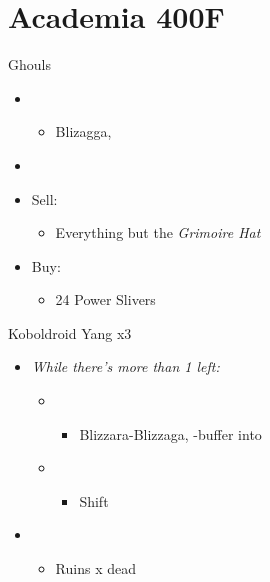 \chapter{Academia 400F}

\begin{battle}{Ghouls}
	\begin{itemize}
		\item \sixth
		      \begin{itemize}
			      \item Blizagga, \comb
		      \end{itemize}
		\item \first
	\end{itemize}
\end{battle}

\begin{shop}{0}
	\begin{itemize}
		\item Sell:
		      \begin{itemize}
			      \item Everything but the \textit{Grimoire Hat}
		      \end{itemize}
		\item Buy:
		      \begin{itemize}
			      \item 24 Power Slivers
		      \end{itemize}
	\end{itemize}
\end{shop}

\begin{battle}{Koboldroid Yang x3}
	\begin{itemize}
		\item \textit{While there's more than 1 left:}
		      \begin{itemize}
			      \item \sixth
			            \begin{itemize}
				            \item Blizzara-Blizzaga, \com-buffer into
			            \end{itemize}
			      \item \first
			            \begin{itemize}
				            \item Shift
			            \end{itemize}
		      \end{itemize}
		\item \first
		      \begin{itemize}
			      \item Ruins x dead
		      \end{itemize}
	\end{itemize}
\end{battle}


